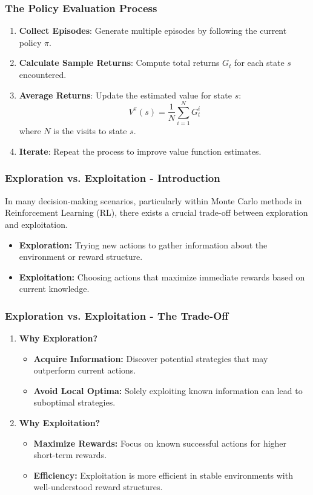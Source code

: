 \documentclass[aspectratio=169]{beamer}
\begin{document}
\begin{frame}[fragile]
    \frametitle{The Policy Evaluation Process}
    \begin{enumerate}
        \item \textbf{Collect Episodes}: Generate multiple episodes by following the current policy \( \pi \).
        \item \textbf{Calculate Sample Returns}: Compute total returns \( G_t \) for each state \( s \) encountered.
        \item \textbf{Average Returns}: Update the estimated value for state \( s \):
            \[
            V^\pi(s) = \frac{1}{N} \sum_{i=1}^{N} G_t^i
            \]
            where \( N \) is the visits to state \( s \).
        \item \textbf{Iterate}: Repeat the process to improve value function estimates.
    \end{enumerate}
\end{frame}

\begin{frame}[fragile]
    \frametitle{Exploration vs. Exploitation - Introduction}
    In many decision-making scenarios, particularly within Monte Carlo methods in Reinforcement Learning (RL), there exists a crucial trade-off between exploration and exploitation. 

    \begin{itemize}
        \item \textbf{Exploration:} Trying new actions to gather information about the environment or reward structure.
        \item \textbf{Exploitation:} Choosing actions that maximize immediate rewards based on current knowledge.
    \end{itemize}
\end{frame}

\begin{frame}[fragile]
    \frametitle{Exploration vs. Exploitation - The Trade-Off}
    \begin{enumerate}
        \item \textbf{Why Exploration?}
        \begin{itemize}
            \item \textbf{Acquire Information:} Discover potential strategies that may outperform current actions.
            \item \textbf{Avoid Local Optima:} Solely exploiting known information can lead to suboptimal strategies.
        \end{itemize}

        \item \textbf{Why Exploitation?}
        \begin{itemize}
            \item \textbf{Maximize Rewards:} Focus on known successful actions for higher short-term rewards.
            \item \textbf{Efficiency:} Exploitation is more efficient in stable environments with well-understood reward structures.
        \end{itemize}
    \end{enumerate}
\end{frame}
\end{document}
